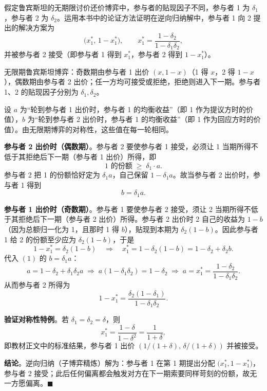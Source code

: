 假定鲁宾斯坦的无期限讨价还价博弈中，参与者的贴现因子不同，参与者 1 为 $\delta_1$，参与者 2 为 $\delta_2$。运用本书中的论证方法证明在逆向归纳解中，参与者 1 向 2 提出的解决方案为
\[
\bigl(x_1^*,\,1-x_1^*\bigr),\qquad
x_1^*=\frac{1-\delta_2}{1-\delta_1\delta_2},
\]\indent
并被参与者 2 接受（即参与者 1 得到 $x_1^*$，参与者 2 得到 $1-x_1^*$）。

\sol
无限期鲁宾斯坦博弈：奇数期由参与者 1 出价 $(x,1-x)$（1 得 $x$，2 得 $1-x$），偶数期由参与者 2 出价；任一方均可接受或拒绝，拒绝则进入下一期。参与者 1、2 的贴现因子分别为 $\delta_1,\delta_2$。

设 $a$ 为“轮到参与者 1 出价时，参与者 1 的均衡收益”（即 1 作为提议方时的价值），$b$ 为“轮到参与者 2 出价时，参与者 1 的均衡收益”（即 1 作为回应方时的价值）。由无限期博弈的对称性，这些值在每一轮相同。

\textbf{参与者 2 出价时（偶数期）}。参与者 2 要使参与者 1 接受，必须让 1 当期所得不低于其拒绝后下一期（参与者 1 出价）所得，即
\[
1\text{ 的份额}\;\ge\;\delta_1\cdot a.
\]\indent
参与者 2 把 1 的份额恰好定为 $\delta_1 a$，自己保留 $1-\delta_1 a$。故当参与者 2 出价时，参与者 1 得到
\[
b=\delta_1 a.\tag{1}
\]

\textbf{参与者 1 出价时（奇数期）}。参与者 1 要使参与者 2 接受，须让 2 当期所得不低于其拒绝后下一期（参与者 2 出价）所得。参与者 2 出价时 2 自己的收益为 $1-b$（因为总额归一化为 1，且那时 1 得 $b$），贴现到本期为 $\delta_2(1-b)$。因此参与者 1 给 2 的份额至少应为 $\delta_2(1-b)$，于是
\[
1-x_1^*=\delta_2(1-b)\quad\Longrightarrow\quad
x_1^*=1-\delta_2(1-b)=1-\delta_2+\delta_2 b.
\]\indent
代入 $(1)$ 的 $b=\delta_1 a$：
\[
a=1-\delta_2+\delta_1\delta_2 a
\;\Longrightarrow\;
a(1-\delta_1\delta_2)=1-\delta_2
\;\Longrightarrow\;
a=x_1^*=\frac{1-\delta_2}{1-\delta_1\delta_2}.
\]\indent
从而参与者 2 所得为
\[
1-x_1^*=\frac{\delta_2(1-\delta_1)}{1-\delta_1\delta_2}.
\]

\textbf{验证对称性特例}。若 $\delta_1=\delta_2=\delta$，则
\[
x_1^*=\frac{1-\delta}{1-\delta^2}=\frac{1}{1+\delta},
\]\indent
即教材正文中的标准结果，参与者 1 出价 $(1/(1+\delta),\,\delta/(1+\delta))$ 并被接受。

\textbf{结论}。逆向归纳（子博弈精炼）解为：参与者 1 在第 1 期提出分配 $\bigl(x_1^*,1-x_1^*\bigr)$，参与者 2 接受；此后任何偏离都会触发对方在下一期索要同样苛刻的份额，故无一方愿偏离。$\blacksquare$

